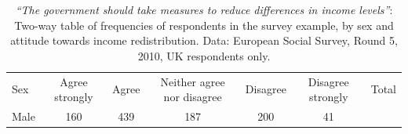 \documentclass[11pt,a4paper,openany]{book}
\begin{document}
\begin{longtable}[]{@{}lcccccr@{}}
\caption{\label{tab:t-sex-attitude} \emph{``The government should take
measures to reduce differences in income levels''}: Two-way table of
frequencies of respondents in the survey example, by sex and attitude
towards income redistribution. Data: European Social Survey, Round 5,
2010, UK respondents only.}\tabularnewline
\toprule
\begin{minipage}[t]{0.21\columnwidth}\raggedright\strut
Sex\strut
\end{minipage} & \begin{minipage}[t]{0.13\columnwidth}\centering\strut
Agree strongly\strut
\end{minipage} & \begin{minipage}[t]{0.07\columnwidth}\centering\strut
Agree\strut
\end{minipage} & \begin{minipage}[t]{0.13\columnwidth}\centering\strut
Neither agree nor disagree\strut
\end{minipage} & \begin{minipage}[t]{0.09\columnwidth}\centering\strut
Disagree\strut
\end{minipage} & \begin{minipage}[t]{0.09\columnwidth}\centering\strut
Disagree strongly\strut
\end{minipage} & \begin{minipage}[t]{0.06\columnwidth}\raggedleft\strut
Total\strut
\end{minipage}\tabularnewline
\begin{minipage}[t]{0.21\columnwidth}\raggedright\strut
Male\strut
\end{minipage} & \begin{minipage}[t]{0.13\columnwidth}\centering\strut
160\strut
\end{minipage} & \begin{minipage}[t]{0.07\columnwidth}\centering\strut
439\strut
\end{minipage} & \begin{minipage}[t]{0.13\columnwidth}\centering\strut
187\strut
\end{minipage} & \begin{minipage}[t]{0.09\columnwidth}\centering\strut
200\strut
\end{minipage} & \begin{minipage}[t]{0.09\columnwidth}\centering\strut
41\strut
\end{minipage} & \begin{minipage}[t]{0.06\columnwidth}\raggedleft\strut

\end{minipage}
\end{longtable}
\end{document}
